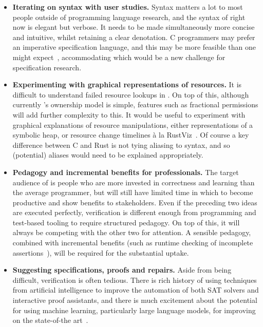 \begin{itemize}
    \item \textbf{Iterating on syntax with user studies.} Syntax matters
        a lot to most people outside of programming language research,
        and the syntax of  right now is elegant but verbose. It
        needs to be made simultaneously more concise and intuitive, whilst
        retaining a clear denotation. C programmers may prefer an imperative
        specification language, and this may be more feasible than one might
        expect~, accommodating which would be a new
        challenge for specification research.
    \item \textbf{Experimenting with graphical representations of resources.}
        It is difficult to understand failed resource lookups in .
        On top of this, although currently 's ownership model is simple,
        features such as fractional permissions will add further complexity to
        this. It would be useful to experiment with graphical explanations of
        resource manipulations, either representations of a symbolic heap, or
        resource change timelines à la
        RustViz~.
        Of course a key difference between C and Rust is not tying aliasing
        to syntax, and so (potential) aliases would need to be explained
        appropriately.
    \item \textbf{Pedagogy and incremental benefits for professionals.}
        The target audience of  is people who are more invested in
        correctness and learning than the average programmer, but will still
        have limited time in which to become productive and show benefits
        to stakeholders. Even if the preceding two ideas are executed perfectly,
        verification is different enough from programming and test-based tooling
        to require structured pedagogy. On top of this, it will always be
        competing with the other two for attention. A sensible pedagogy,
        combined with incremental benefits (such as runtime checking of
        incomplete assertions~), will
        be required for the substantial uptake.
    \item \textbf{Suggesting specifications, proofs and repairs.} Aside from
        being difficult, verification is often tedious. There is rich history
        of using techniques from artificial intelligence to improve the
        automation of both SAT solvers and interactive proof assistants, and
        there is much excitement about the potential for using machine
        learning, particularly large language models, for improving on the
        state-of-the art~.
\end{itemize}
